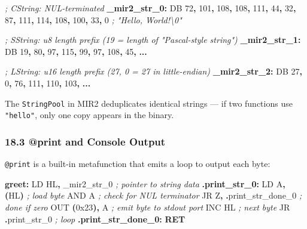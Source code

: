 \documentclass[
  11pt,
]{article}
\newenvironment{Shaded}{\begin{snugshade}}{\end{snugshade}}
\newcommand{\BaseNTok}[1]{\textcolor[rgb]{0.00,0.00,0.81}{#1}}
\newcommand{\BuiltInTok}[1]{#1}
\newcommand{\CommentTok}[1]{\textcolor[rgb]{0.56,0.35,0.01}{\textit{#1}}}
\newcommand{\ControlFlowTok}[1]{\textcolor[rgb]{0.13,0.29,0.53}{\textbf{#1}}}
\newcommand{\DataTypeTok}[1]{\textcolor[rgb]{0.13,0.29,0.53}{#1}}
\newcommand{\DecValTok}[1]{\textcolor[rgb]{0.00,0.00,0.81}{#1}}
\newcommand{\FunctionTok}[1]{\textcolor[rgb]{0.13,0.29,0.53}{\textbf{#1}}}
\newcommand{\NormalTok}[1]{#1}
\newcommand{\OperatorTok}[1]{\textcolor[rgb]{0.81,0.36,0.00}{\textbf{#1}}}
\begin{document}
\begin{Shaded}
\begin{Highlighting}[]
\CommentTok{; CString: NUL{-}terminated}
\FunctionTok{\_mir2\_str\_0:}
    \DataTypeTok{DB} \DecValTok{72}\OperatorTok{,} \DecValTok{101}\OperatorTok{,} \DecValTok{108}\OperatorTok{,} \DecValTok{108}\OperatorTok{,} \DecValTok{111}\OperatorTok{,} \DecValTok{44}\OperatorTok{,} \DecValTok{32}\OperatorTok{,} \DecValTok{87}\OperatorTok{,} \DecValTok{111}\OperatorTok{,} \DecValTok{114}\OperatorTok{,} \DecValTok{108}\OperatorTok{,} \DecValTok{100}\OperatorTok{,} \DecValTok{33}\OperatorTok{,} \DecValTok{0}
    \CommentTok{; "Hello, World!\textbackslash{}0"}

\CommentTok{; SString: u8 length prefix (19 = length of "Pascal{-}style string")}
\FunctionTok{\_mir2\_str\_1:}
    \DataTypeTok{DB} \DecValTok{19}\OperatorTok{,} \DecValTok{80}\OperatorTok{,} \DecValTok{97}\OperatorTok{,} \DecValTok{115}\OperatorTok{,} \DecValTok{99}\OperatorTok{,} \DecValTok{97}\OperatorTok{,} \DecValTok{108}\OperatorTok{,} \DecValTok{45}\OperatorTok{,} \OperatorTok{...}

\CommentTok{; LString: u16 length prefix (27, 0 = 27 in little{-}endian)}
\FunctionTok{\_mir2\_str\_2:}
    \DataTypeTok{DB} \DecValTok{27}\OperatorTok{,} \DecValTok{0}\OperatorTok{,} \DecValTok{76}\OperatorTok{,} \DecValTok{111}\OperatorTok{,} \DecValTok{110}\OperatorTok{,} \DecValTok{103}\OperatorTok{,} \OperatorTok{...}
\end{Highlighting}
\end{Shaded}

The \texttt{StringPool} in MIR2 deduplicates identical strings --- if
two functions use \texttt{"hello"}, only one copy appears in the binary.

\hypertarget{print-and-console-output}{%
\subsubsection{18.3 @print and Console
Output}\label{print-and-console-output}}

\texttt{@print} is a built-in metafunction that emits a loop to output
each byte:

\begin{Shaded}
\begin{Highlighting}[]
\FunctionTok{greet:}
\NormalTok{    LD HL}\OperatorTok{,}\NormalTok{ \_mir2\_str\_0       }\CommentTok{; pointer to string data}
\FunctionTok{.print\_str\_0:}
\NormalTok{    LD A}\OperatorTok{,} \OperatorTok{(}\NormalTok{HL}\OperatorTok{)}               \CommentTok{; load byte}
    \BuiltInTok{AND}\NormalTok{ A                    }\CommentTok{; check for NUL terminator}
\NormalTok{    JR Z}\OperatorTok{,} \OperatorTok{.}\NormalTok{print\_str\_done\_0  }\CommentTok{; done if zero}
    \BuiltInTok{OUT} \OperatorTok{(}\BaseNTok{0x23}\OperatorTok{),}\NormalTok{ A            }\CommentTok{; emit byte to stdout port}
    \BuiltInTok{INC}\NormalTok{ HL                   }\CommentTok{; next byte}
\NormalTok{    JR }\OperatorTok{.}\NormalTok{print\_str\_0          }\CommentTok{; loop}
\FunctionTok{.print\_str\_done\_0:}
    \ControlFlowTok{RET}
\end{Highlighting}
\end{Shaded}
\end{document}
